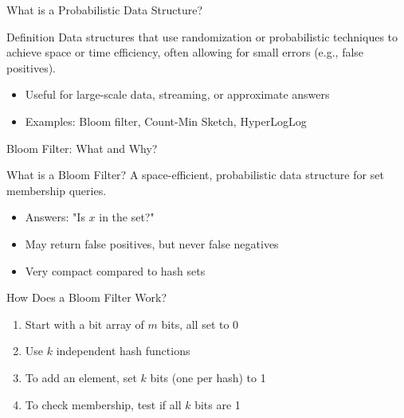 \documentclass[aspectratio=169]{beamer}
\begin{document}
\begin{frame}{What is a Probabilistic Data Structure?}
  \begin{block}{Definition}
    Data structures that use randomization or probabilistic techniques to achieve space or time efficiency, often allowing for small errors (e.g., false positives).
  \end{block}

  \begin{itemize}
    \item Useful for large-scale data, streaming, or approximate answers
    \item Examples: Bloom filter, Count-Min Sketch, HyperLogLog
  \end{itemize}
\end{frame}

\begin{frame}{Bloom Filter: What and Why?}
  \begin{block}{What is a Bloom Filter?}
    A space-efficient, probabilistic data structure for set membership queries.
  \end{block}

  \begin{itemize}
    \item Answers: "Is $x$ in the set?"
    \item May return false positives, but never false negatives
    \item Very compact compared to hash sets
  \end{itemize}
\end{frame}

\begin{frame}{How Does a Bloom Filter Work?}
  \begin{enumerate}
    \item Start with a bit array of $m$ bits, all set to 0

    \item Use $k$ independent hash functions

    \item To add an element, set $k$ bits (one per hash) to 1

    \item To check membership, test if all $k$ bits are 1
  \end{enumerate}
\end{frame}
\end{document}
